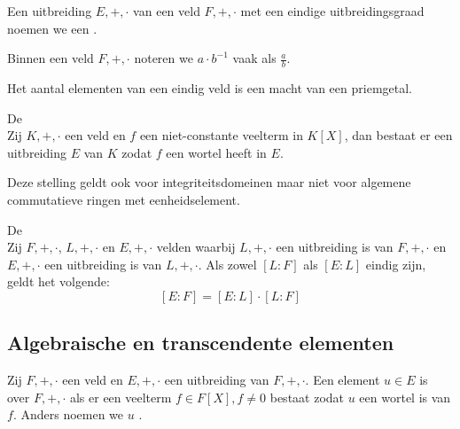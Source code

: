 \documentclass[main.tex]{subfiles}
\begin{document}
\begin{de}
  Een uitbreiding $E,+,\cdot$ van een veld $F,+,\cdot$ met een eindige uitbreidingsgraad noemen we een .
\end{de}

\begin{de}
  Binnen een veld $F,+,\cdot$ noteren we $a\cdot b^{-1}$ vaak als $\frac{a}{b}$.
\end{de}

\begin{st}
  Het aantal elementen van een eindig veld is een macht van een priemgetal.
\end{st}

\begin{st}
  De \\
  Zij $K,+,\cdot$ een veld en $f$ een niet-constante veelterm in $K[X]$, dan bestaat er een uitbreiding $E$ van $K$ zodat $f$ een wortel heeft in $E$.
\end{st}

\begin{opm}
  Deze stelling geldt ook voor integriteitsdomeinen
  maar niet voor algemene commutatieve ringen met eenheidselement.
\end{opm}

\begin{st}
  De \\
  Zij $F,+,\cdot$, $L,+,\cdot$ en $E,+,\cdot$ velden waarbij $L,+,\cdot$ een uitbreiding is van $F,+,\cdot$ en $E,+,\cdot$ een uitbreiding is van $L,+,\cdot$.
  Als zowel $[L:F]$ als $[E:L]$ eindig zijn, geldt het volgende:
  \[ [E:F] = [E:L] \cdot [L:F]\]
\end{st}

\subsection{Algebraische en transcendente elementen}
\label{sec:algebr-en-transc}

\begin{de}
  Zij $F,+,\cdot$ een veld en $E,+,\cdot$ een uitbreiding van $F,+,\cdot$.
  Een element $u\in E$ is  over $F,+,\cdot$ als er een veelterm $f\in F[X], f\neq 0$ bestaat zodat $u$ een wortel is van $f$.
  Anders noemen we $u$ .
\end{de}
\end{document}
